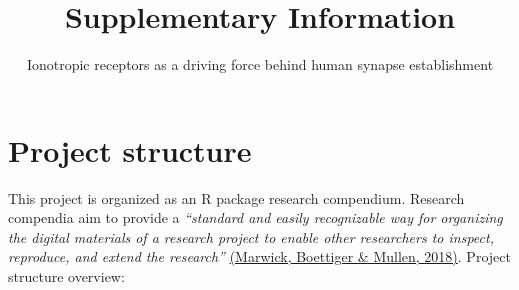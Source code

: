 \documentclass[
]{article}
\title{Supplementary Information}
\subtitle{Ionotropic receptors as a driving force behind human synapse
establishment}
\date{}
\begin{document}
\maketitle

{
\setcounter{tocdepth}{3}
\tableofcontents
}
\hypertarget{project-structure}{%
\section{Project structure}\label{project-structure}}

This project is organized as an R package research compendium. Research
compendia aim to provide a \emph{``standard and easily recognizable way
for organizing the digital materials of a research project to enable
other researchers to inspect, reproduce, and extend the research''}
\href{https://doi.org/10.1080/00031305.2017.1375986}{(Marwick, Boettiger
\& Mullen, 2018)}. Project structure overview:
\end{document}
